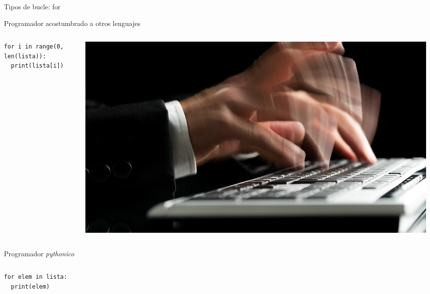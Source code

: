\documentclass[bigger,unknownkeysallowed]{beamer}
\begin{document}
\begin{frame}[fragile,label={sec:org4d41cb9}]{Tipos de bucle: for}
 \begin{block}{Programador acostumbrado a otros lenguajes}
\begin{columns}
\begin{column}{0.4\columnwidth}
\begin{verbatim}
for i in range(0, len(lista)):
  print(lista[i])
\end{verbatim}
\end{column}

\begin{column}{0.5\columnwidth}
\begin{center}
\begin{center}
\includegraphics[width=.7\textwidth]{workinghard.jpg}
\end{center}
\end{center}
\end{column}
\end{columns}
\end{block}

\begin{block}{Programador \emph{pythonico}}
\begin{columns}
\begin{column}{0.5\columnwidth}
\begin{verbatim}
for elem in lista:
  print(elem)
\end{verbatim}
\end{column}


\end{columns}
\end{block}
\end{frame}
\end{document}
